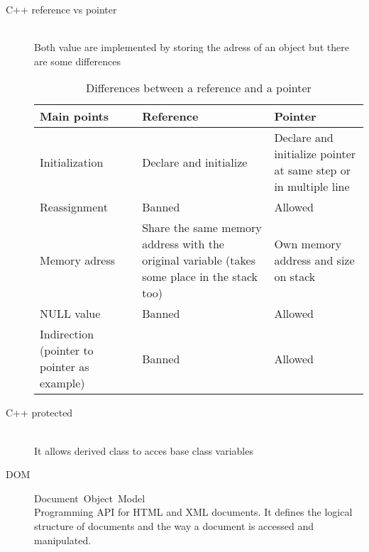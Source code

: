 \documentclass{article}
\begin{document}
\begin{description}
    \item[C++ reference vs pointer] \mbox{}\\
    Both value are implemented by storing the adress of an object but there are some differences
    \begin{table}[htb]
        \caption {Differences between a reference and a pointer}
        \begin{tabular}{ | p{4cm} | p{4cm} | p{4cm} | }
            \hline
            \textbf{Main points} & \textbf{Reference} & \textbf{Pointer} \\
            \hline
            Initialization & Declare and initialize & Declare and initialize pointer at same step or in multiple line \\
            \hline
            Reassignment & Banned & Allowed \\
            \hline
            Memory adress & Share the same memory address with the original variable (takes some place in the stack too) & Own memory address and size on stack\\
            \hline
            NULL value & Banned & Allowed \\
            \hline
            Indirection (pointer to pointer as example) & Banned & Allowed\\
            \hline
           \end{tabular}
        \end{table}

    \item[C++ protected] \mbox{} \\
    It allows derived class to acces base class variables

    \item[DOM] \mbox{Document Object Model} \\
    Programming API for HTML and XML documents. It defines the logical structure of documents and the way a document is accessed and manipulated.

\end{description}
\end{document}
